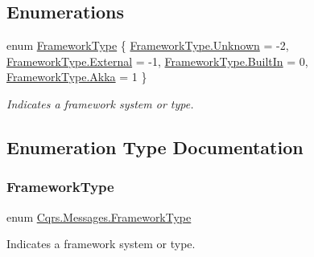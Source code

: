 \subsection*{Enumerations}
\begin{DoxyCompactItemize}
\item 
enum \hyperlink{namespaceCqrs_1_1Messages_af06a7e6cd2609043d0f2f5f3419f81e3_af06a7e6cd2609043d0f2f5f3419f81e3}{Framework\+Type} \{ \hyperlink{namespaceCqrs_1_1Messages_af06a7e6cd2609043d0f2f5f3419f81e3_af06a7e6cd2609043d0f2f5f3419f81e3a88183b946cc5f0e8c96b2e66e1c74a7e}{Framework\+Type.\+Unknown} = -\/2, 
\hyperlink{namespaceCqrs_1_1Messages_af06a7e6cd2609043d0f2f5f3419f81e3_af06a7e6cd2609043d0f2f5f3419f81e3ab206a1b4ea1097761f78e8876f6da779}{Framework\+Type.\+External} = -\/1, 
\hyperlink{namespaceCqrs_1_1Messages_af06a7e6cd2609043d0f2f5f3419f81e3_af06a7e6cd2609043d0f2f5f3419f81e3aca8f2e8d70641ce17b9b304086c19657}{Framework\+Type.\+Built\+In} = 0, 
\hyperlink{namespaceCqrs_1_1Messages_af06a7e6cd2609043d0f2f5f3419f81e3_af06a7e6cd2609043d0f2f5f3419f81e3a1565c979ff6d5255fd3c81f57219fffc}{Framework\+Type.\+Akka} = 1
 \}\begin{DoxyCompactList}\small\item\em Indicates a framework system or type. \end{DoxyCompactList}
\end{DoxyCompactItemize}


\subsection{Enumeration Type Documentation}
\mbox{\label{namespaceCqrs_1_1Messages_af06a7e6cd2609043d0f2f5f3419f81e3_af06a7e6cd2609043d0f2f5f3419f81e3}} 
\subsubsection{\texorpdfstring{Framework\+Type}{FrameworkType}}
{\footnotesize\ttfamily enum \hyperlink{namespaceCqrs_1_1Messages_af06a7e6cd2609043d0f2f5f3419f81e3_af06a7e6cd2609043d0f2f5f3419f81e3}{Cqrs.\+Messages.\+Framework\+Type}\hspace{0.3cm}{\ttfamily [strong]}}



Indicates a framework system or type. 

